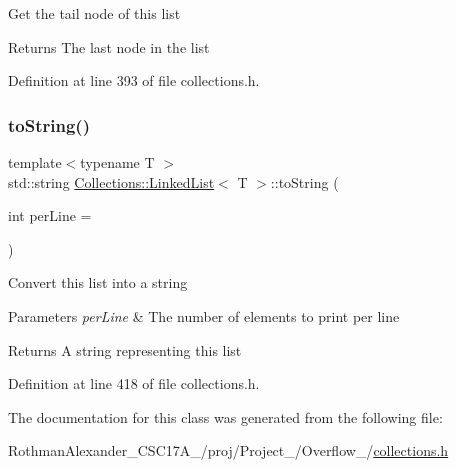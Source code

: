 Get the tail node of this list \begin{DoxyReturn}{Returns}
The last node in the list 
\end{DoxyReturn}


Definition at line 393 of file collections.\+h.

\hypertarget{class_collections_1_1_linked_list_aa31d67c806b697431151be9264c80ea7}{}\label{class_collections_1_1_linked_list_aa31d67c806b697431151be9264c80ea7} 
\subsubsection{\texorpdfstring{to\+String()}{toString()}}
{\footnotesize\ttfamily template$<$typename T $>$ \\
std\+::string \hyperlink{class_collections_1_1_linked_list}{Collections\+::\+Linked\+List}$<$ T $>$\+::to\+String (\begin{DoxyParamCaption}\item[{int}]{per\+Line = {} }\end{DoxyParamCaption})}

Convert this list into a string 
\begin{DoxyParams}{Parameters}
{\em per\+Line} & The number of elements to print per line \\
\hline
\end{DoxyParams}
\begin{DoxyReturn}{Returns}
A string representing this list 
\end{DoxyReturn}


Definition at line 418 of file collections.\+h.



The documentation for this class was generated from the following file\+:\begin{DoxyCompactItemize}
\item 
Rothman\+Alexander\+\_\+\+C\+S\+C17\+A\+\_/proj/\+Project\+\_/\+Overflow\+\_/\hyperlink{collections_8h}{collections.\+h}\end{DoxyCompactItemize}
